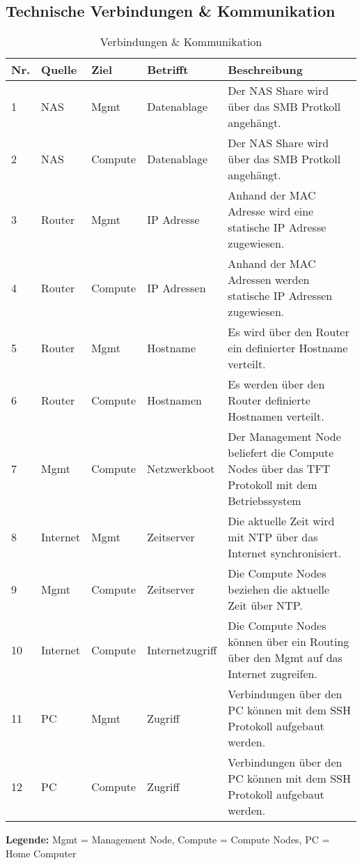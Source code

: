 \subsection{Technische Verbindungen \& Kommunikation}
\begin{table}[H]
\centering
\begin{tabular}{p{1cm}p{1.5cm}p{1.5cm}p{2.2cm}p{8.8cm}}
\hline
\rowcolor{heading} \textbf{Nr.} & \textbf{Quelle} & \textbf{Ziel }& \textbf{Betrifft} & \textbf{Beschreibung} \\\hline
1 & NAS & Mgmt & Datenablage & Der NAS Share wird über das SMB Protkoll angehängt. \\\hline
2 & NAS & Compute & Datenablage & Der NAS Share wird über das SMB Protkoll angehängt. \\\hline
3 & Router & Mgmt & IP Adresse & Anhand der MAC Adresse wird eine statische IP Adresse zugewiesen. \\\hline
4 & Router & Compute & IP Adressen & Anhand der MAC Adressen werden statische IP Adressen zugewiesen. \\\hline
5 & Router & Mgmt &Hostname & Es wird über den Router ein definierter Hostname verteilt. \\\hline
6 & Router & Compute & Hostnamen & Es werden über den Router definierte Hostnamen verteilt. \\\hline
7 & Mgmt & Compute & Netzwerkboot & Der Management Node beliefert die Compute Nodes über das TFT Protokoll mit dem Betriebssystem \\\hline
8 & Internet & Mgmt & Zeitserver & Die aktuelle Zeit wird mit NTP über das Internet synchronisiert.\\\hline
9 & Mgmt & Compute & Zeitserver & Die Compute Nodes beziehen die aktuelle Zeit über NTP.\\\hline
10 & Internet & Compute & Internetzugriff & Die Compute Nodes können über ein Routing über den Mgmt auf das Internet zugreifen. \\\hline
11 & PC & Mgmt & Zugriff & Verbindungen über den PC können mit dem SSH Protokoll aufgebaut werden. \\\hline
12 & PC & Compute & Zugriff & Verbindungen über den PC können mit dem SSH Protokoll aufgebaut werden. \\\hline
\end{tabular}
\caption{Verbindungen \& Kommunikation}
\end{table}
\textbf{Legende:} Mgmt = Management Node, Compute = Compute Nodes, PC = Home Computer
